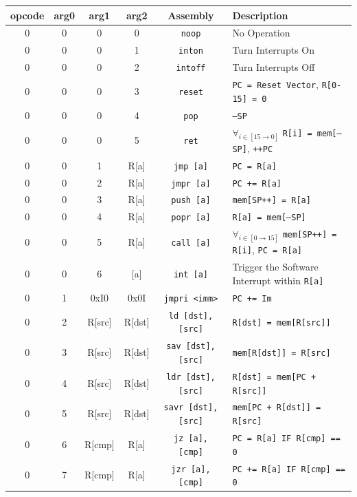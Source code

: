 \documentclass{article}
\begin{document}
\begin{table}[h!]
	\centering
	\begin{footnotesize}
		\begin{tabular}{cccc|c|l}
			\hline
			opcode & arg0 & arg1 & arg2 & Assembly & Description \\
			\hline
			0 & 0 & 0 & 0 & \texttt{noop} & No Operation \\
			0 & 0 & 0 & 1 & \texttt{inton} & Turn Interrupts On \\
			0 & 0 & 0 & 2 & \texttt{intoff} & Turn Interrupts Off \\
			0 & 0 & 0 & 3 & \texttt{reset} & \texttt{PC = Reset Vector}, \texttt{R[0-15] = 0} \\
			0 & 0 & 0 & 4 & \texttt{pop} & \texttt{--SP} \\
			0 & 0 & 0 & 5 & \texttt{ret} & $\forall_{i \in [15 \rightarrow 0]}$ \texttt{R[i] = mem[--SP]}, \texttt{++PC} \\
			0 & 0 & 1 & R[a] & \texttt{jmp [a]} & \texttt{PC = R[a]} \\
			0 & 0 & 2 & R[a] & \texttt{jmpr [a]} & \texttt{PC += R[a]} \\
			0 & 0 & 3 & R[a] & \texttt{push [a]} & \texttt{mem[SP++] = R[a]} \\
			0 & 0 & 4 & R[a] & \texttt{popr [a]} & \texttt{R[a] = mem[--SP]} \\
			0 & 0 & 5 & R[a] & \texttt{call [a]} & $\forall_{i \in [0 \rightarrow 15]}$
			 \texttt{mem[SP++] = R[i]}, \texttt{PC = R[a]} \\
 			0 & 0 & 6 & [a] & \texttt{int [a]} & Trigger the Software Interrupt within \texttt{R[a]} \\
			0 & 1 & 0xI0 & 0x0I & \texttt{jmpri <imm>} & \texttt{PC += Im} \\
			0 & 2 & R[src] & R[dst] & \texttt{ld [dst], [src]} & \texttt{R[dst] = mem[R[src]]} \\
			0 & 3 & R[src] & R[dst] & \texttt{sav [dst], [src]} & \texttt{mem[R[dst]] = R[src]} \\
			0 & 4 & R[src] & R[dst] & \texttt{ldr [dst], [src]} & \texttt{R[dst] = mem[PC + R[src]]} \\
			0 & 5 & R[src] & R[dst] & \texttt{savr [dst], [src]} & \texttt{mem[PC + R[dst]] = R[src]} \\
			0 & 6 & R[cmp] & R[a] & \texttt{jz [a], [cmp]} & \texttt{PC = R[a] IF R[cmp] == 0} \\
			0 & 7 & R[cmp] & R[a] & \texttt{jzr [a], [cmp]} & \texttt{PC += R[a] IF R[cmp] == 0} \\

\end{tabular}
\end{footnotesize}
\end{table}
\end{document}
